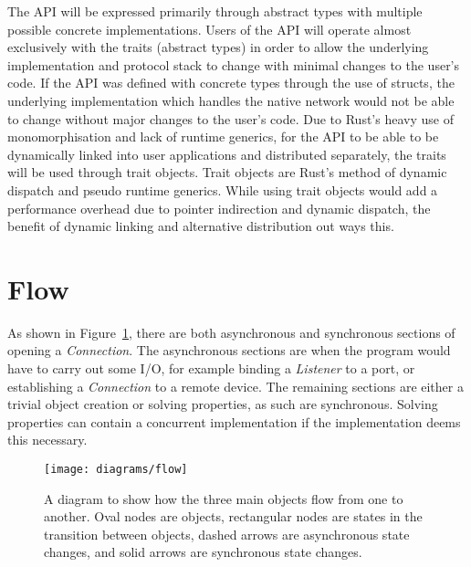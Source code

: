 \documentclass{l4proj}
\begin{document}
The API will be expressed primarily through abstract types with multiple possible concrete implementations.
Users of the API will operate almost exclusively with the traits (abstract types) in order to allow the underlying
implementation and protocol stack to change with minimal changes to the user's code.
If the API was defined with concrete types through the use of structs, the underlying implementation which handles
the native network would not be able to change without major changes to the user's code.
Due to Rust's heavy use of monomorphisation and lack of runtime generics, for the API to be able to be dynamically
linked into user applications and distributed separately, the traits will be used through trait objects.
Trait objects are Rust's method of dynamic dispatch and pseudo runtime generics.
While using trait objects would add a performance overhead due to pointer indirection and dynamic dispatch, the benefit
of dynamic linking and alternative distribution out ways this.

\section{Flow}\label{sec:flow}
As shown in Figure~\ref{fig:flow}, there are both asynchronous and synchronous sections of opening a \emph{Connection}.
The asynchronous sections are when the program would have to carry out some I/O, for example binding a \emph{Listener}
to a port, or establishing a \emph{Connection} to a remote device.
The remaining sections are either a trivial object creation or solving properties, as such are synchronous.
Solving properties can contain a concurrent implementation if the implementation deems this necessary.

\begin{figure}[h]
\centering
\texttt{[image: diagrams/flow]}
\caption{A diagram to show how the three main objects flow from one to another.
Oval nodes are objects, rectangular nodes are states in the transition between objects, dashed arrows are
asynchronous state changes, and solid arrows are synchronous state changes.}
\label{fig:flow}
\end{figure}
\end{document}
